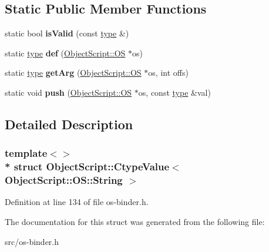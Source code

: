 \subsection*{Static Public Member Functions}
\begin{DoxyCompactItemize}
\item 
static bool {\bfseries is\+Valid} (const \hyperlink{class_object_script_1_1_o_s_1_1_string}{type} \&)\hypertarget{struct_object_script_1_1_ctype_value_3_01_object_script_1_1_o_s_1_1_string_01_4_a2620c52620683e046f7a413e2b0691f7}{}\label{struct_object_script_1_1_ctype_value_3_01_object_script_1_1_o_s_1_1_string_01_4_a2620c52620683e046f7a413e2b0691f7}

\item 
static \hyperlink{class_object_script_1_1_o_s_1_1_string}{type} {\bfseries def} (\hyperlink{class_object_script_1_1_o_s}{Object\+Script\+::\+OS} $\ast$os)\hypertarget{struct_object_script_1_1_ctype_value_3_01_object_script_1_1_o_s_1_1_string_01_4_a693d63c13733c5e07bcac2343b389b0e}{}\label{struct_object_script_1_1_ctype_value_3_01_object_script_1_1_o_s_1_1_string_01_4_a693d63c13733c5e07bcac2343b389b0e}

\item 
static \hyperlink{class_object_script_1_1_o_s_1_1_string}{type} {\bfseries get\+Arg} (\hyperlink{class_object_script_1_1_o_s}{Object\+Script\+::\+OS} $\ast$os, int offs)\hypertarget{struct_object_script_1_1_ctype_value_3_01_object_script_1_1_o_s_1_1_string_01_4_a571a449cf783a03975e7da9f7d05e3d7}{}\label{struct_object_script_1_1_ctype_value_3_01_object_script_1_1_o_s_1_1_string_01_4_a571a449cf783a03975e7da9f7d05e3d7}

\item 
static void {\bfseries push} (\hyperlink{class_object_script_1_1_o_s}{Object\+Script\+::\+OS} $\ast$os, const \hyperlink{class_object_script_1_1_o_s_1_1_string}{type} \&val)\hypertarget{struct_object_script_1_1_ctype_value_3_01_object_script_1_1_o_s_1_1_string_01_4_a1d8ed835e3cb5096046a85a033e37194}{}\label{struct_object_script_1_1_ctype_value_3_01_object_script_1_1_o_s_1_1_string_01_4_a1d8ed835e3cb5096046a85a033e37194}

\end{DoxyCompactItemize}


\subsection{Detailed Description}
\subsubsection*{template$<$$>$\\*
struct Object\+Script\+::\+Ctype\+Value$<$ Object\+Script\+::\+O\+S\+::\+String $>$}



Definition at line 134 of file os-\/binder.\+h.



The documentation for this struct was generated from the following file\+:\begin{DoxyCompactItemize}
\item 
src/os-\/binder.\+h\end{DoxyCompactItemize}
